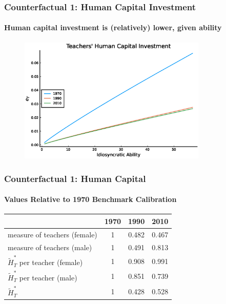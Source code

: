 \documentclass[11pt]{beamer}
\begin{document}
\begin{frame}
\frametitle{Counterfactual 1: Human Capital Investment}
\framesubtitle{Human capital investment is (relatively) lower, given ability}
\label{counter_invest}
\begin{figure}
 		\begin{center}
 			\includegraphics[width=0.8\textwidth]{eT_steadystate_counter3.eps}
 			\label{ }
 		\end{center}
 	\end{figure}
  \hyperlink{count}{} \hyperlink{base_invest}{}
\end{frame}

\begin{frame}
\frametitle{Counterfactual 1: Human Capital}
\framesubtitle{Values Relative to 1970 Benchmark Calibration}
\label{counter_humcap}
\begin{table}
  \centering \begin{tabular}{lccc}
\toprule
& 1970 & 1990 & 2010 \\
\midrule
measure of teachers (female) & 1 & 0.482 & 0.467\\
measure of teachers (male) & 1 & 0.491 & 0.813\\
$\widetilde{H}_T^*$ per teacher (female)   & 1  & 0.908 & 0.991 \\
$\widetilde{H}_T^*$ per teacher (male)   & 1 & 0.851 & 0.739 \\
$\widetilde{H}_T^*$ & 1  & 0.428 & 0.528 \\
\bottomrule
\end{tabular}
\end{table}
 \hyperlink{count}{}  \hyperlink{base_humcap}{}
\end{frame}
\end{document}
